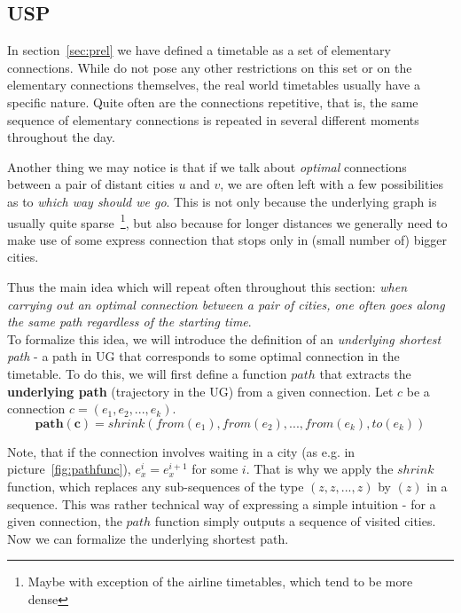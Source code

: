 \subsection{USP}

	In section~\ref{sec:prel} we have defined a timetable as a set of elementary connections. While do not pose any other restrictions on this set or on the elementary connections themselves, the real world timetables usually have a specific nature. Quite often are the connections repetitive, that is, the same sequence of elementary connections is repeated in several different moments throughout the day.
	
	Another thing we may notice is that if we talk about \textit{optimal} connections between a pair of distant cities $u$ and $v$, we are often left with a few possibilities as to \textit{which way should we go}. This is not only because the underlying graph is usually quite sparse~\footnote{Maybe with exception of the airline timetables, which tend to be more dense}, but also because for longer distances we generally need to make use of some express connection that stops only in (small number of) bigger cities.
	
	Thus the main idea which will repeat often throughout this section: \textit{when carrying out an optimal connection between a pair of cities, one often goes along the same path regardless of the starting time}. \\
	
	\noindent To formalize this idea, we will introduce the definition of an \textit{underlying shortest path} - a path in UG that corresponds to some optimal connection in the timetable. To do this, we will first define a function $path$ that extracts the \textbf{underlying path} (trajectory in the UG) from a given connection. Let $c$ be a connection $c = (e_{1}, e_{2}, ..., e_{k})$. \\
	
	\begin{equation*}
		\bm{path(c)} = shrink(from(e_{1}), from(e_{2}), ..., from(e_{k}), to(e_{k}))
	\end{equation*}
	
	\noindent Note, that if the connection involves waiting in a city (as e.g. in picture~\ref{fig:pathfunc}), $e_{x}^{i} = e_{x}^{i + 1}$ for some $i$. That is why we apply the $shrink$ function, which replaces any sub-sequences of the type $(z, z, ..., z)$ by $(z)$ in a sequence. This was rather technical way of expressing a simple intuition - for a given connection, the $path$ function simply outputs a sequence of visited cities. Now we can formalize the underlying shortest path.
	
